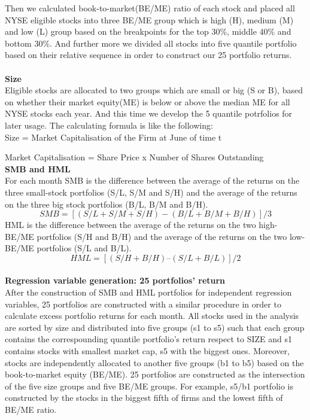 \documentclass[12pt]{article}
\begin{document}
 Then we calculated book-to-market(BE/ME) ratio of each stock and placed all NYSE eligible stocks into three BE/ME group which is high (H), medium (M) and low (L) group based on the breakpoints for the top 30\%, middle 40\% and bottom 30\%. And further more we divided all stocks into five quantile portfolio based on their relative sequence in order to construct our 25 portfolio returns.\\ \\
\textbf{Size}\\
Eligible stocks are allocated to two groups which are small or big (S or B), based on whether their market equity(ME) is below or above the median ME for all NYSE stocks each year. And this time we develop the 5 quantile potrfolios for later usage. The calculating formula is like the following: \\ 

Size = Market Capitalisation of the Firm at June of time t

Market Capitalisation = Share Price x Number of Shares Outstanding \\

\textbf{SMB and HML}\\
\noindent For each month SMB is the difference between the average of the returns on the three small-stock portfolios (S/L, S/M and S/H) and the average of the returns on the three big stock portfolios (B/L, B/M and B/H).
$$
SMB=[(S/L+S/M+S/H)-(B/L+B/M+B/H)]/3
$$
HML is the difference between the average of the returns on the two high-BE/ME portfolios (S/H and B/H) and the average of the returns on the two low-BE/ME portfolios (S/L and B/L).
$$
HML = [(S/H+B/H)–(S/L+B/L)]/2
$$
\noindent \\ \textbf{Regression variable generation: 25 portfolios' return}\\
After the construction of SMB and HML portfolios for independent regression variables, 25 portfolios are constructed with a similar procedure in order to calculate excess portfolio returns for each month. All  stocks used in the analysis are sorted by size and distributed into five groups (s1 to s5) such that each group contains the correspounding quantile portfolio's return respect to SIZE and s1 contains stocks with smallest market cap, s5 with the biggest ones. Moreover, stocks are independently allocated to another five groups (b1 to b5) based on the book-to-market equity (BE/ME). 25 portfolios are constructed as the intersection of the five size groups and five BE/ME groups. For example, s5/b1 portfolio is constructed by the stocks in the biggest fifth of firms and the lowest fifth of BE/ME ratio.\\ 
\end{document}
